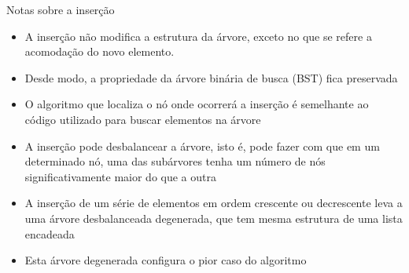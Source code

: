 \begin{frame}[fragile]{Notas sobre a inserção}

	\begin{itemize}
		\item A inserção { não} modifica a estrutura da árvore, { exceto} no que se refere a acomodação do novo elemento.

        \item Desde modo, a propriedade da árvore binária de busca (BST) fica preservada  

		\item O algoritmo que localiza o nó onde ocorrerá a inserção é semelhante ao código 
            utilizado para buscar elementos na árvore

		\item A inserção pode desbalancear a árvore, isto é, pode fazer com que em um determinado 
            nó, uma das 
            subárvores tenha um número de nós significativamente maior do que a outra

        \item A inserção de um série de elementos em ordem crescente ou decrescente leva a 
            uma árvore desbalanceada degenerada, que tem mesma estrutura de uma lista encadeada

        \item Esta árvore degenerada configura o pior caso do algoritmo
	\end{itemize}

\end{frame}
